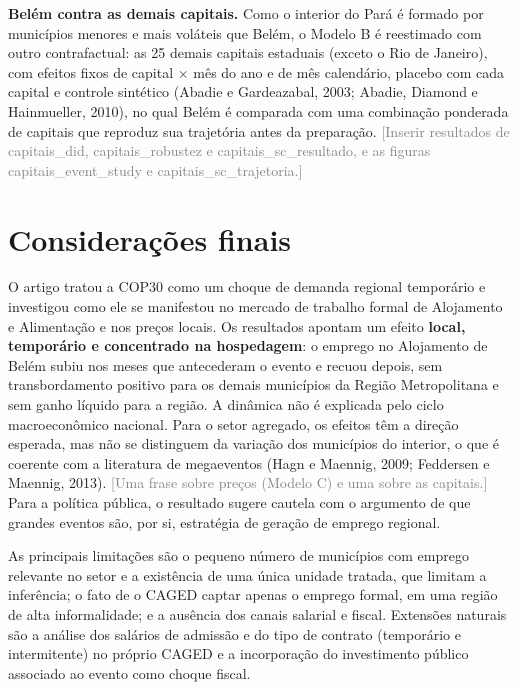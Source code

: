\documentclass[12pt,a4paper]{article}
\newcommand{\afazer}[1]{\textcolor{gray}{[#1]}}
\begin{document}
\textbf{Belém contra as demais capitais.} Como o interior do Pará é formado por municípios menores e
mais voláteis que Belém, o Modelo B é reestimado com outro contrafactual: as 25 demais capitais
estaduais (exceto o Rio de Janeiro), com efeitos fixos de capital $\times$ mês do ano e de mês
calendário, placebo com cada capital e controle sintético (Abadie e Gardeazabal, 2003; Abadie,
Diamond e Hainmueller, 2010), no qual Belém é comparada com uma combinação ponderada de capitais que reproduz sua trajetória antes da
preparação. \afazer{Inserir resultados de capitais\_did, capitais\_robustez e capitais\_sc\_resultado,
e as figuras capitais\_event\_study e capitais\_sc\_trajetoria.}

\section{Considerações finais}

O artigo tratou a COP30 como um choque de demanda regional temporário e investigou como ele se
manifestou no mercado de trabalho formal de Alojamento e Alimentação e nos preços locais. Os
resultados apontam um efeito \textbf{local, temporário e concentrado na hospedagem}: o emprego no
Alojamento de Belém subiu nos meses que antecederam o evento e recuou depois, sem transbordamento
positivo para os demais municípios da Região Metropolitana e sem ganho líquido para a região. A
dinâmica não é explicada pelo ciclo macroeconômico nacional. Para o setor agregado, os efeitos têm a
direção esperada, mas não se distinguem da variação dos municípios do interior, o que é coerente com a
literatura de megaeventos (Hagn e Maennig, 2009; Feddersen e Maennig, 2013). \afazer{Uma frase sobre
preços (Modelo C) e uma sobre as capitais.} Para a política pública, o resultado sugere cautela com o
argumento de que grandes eventos são, por si, estratégia de geração de emprego regional.

As principais limitações são o pequeno número de municípios com emprego relevante no setor e a
existência de uma única unidade tratada, que limitam a inferência; o fato de o CAGED captar apenas o
emprego formal, em uma região de alta informalidade; e a ausência dos canais salarial e fiscal.
Extensões naturais são a análise dos salários de admissão e do tipo de contrato (temporário e
intermitente) no próprio CAGED e a incorporação do investimento público associado ao evento como
choque fiscal.

\end{document}
